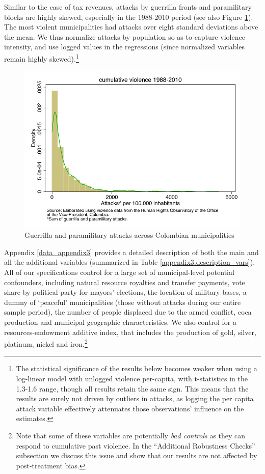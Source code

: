 Similar to the case of tax revenues, attacks by guerrilla fronts and paramilitary blocks are highly skewed, especially in the 1988-2010 period (see also Figure \ref{chapter3_fig:map}). The most violent municipalities had attacks over eight standard deviations above the mean. We thus normalize attacks by population so as to capture violence intensity, and use logged values in the regressions (since normalized variables remain highly skewed).\footnote{The statistical significance of the results below becomes weaker when using a log-linear model with unlogged violence per-capita, with t-statistics in the 1.3-1.6 range, though all results retain the same sign. This means that the results are surely not driven by outliers in attacks, as logging the per capita attack variable effectively attenuates those observations' influence on the estimates.}

\begin{figure}[H]
\begin{center}
\caption{Guerrilla and paramilitary attacks across Colombian municipalities}
\label{chapter3_fig:map}
\includegraphics[width=1\textwidth]{Chapter3/Figures/figure4.pdf}
\end{center}
\end{figure}

Appendix \ref{data_appendix3} provides a detailed description of both the main and all the additional variables (summarized in Table \ref{appendix3:description_vars}). All of our specifications control for a large set of municipal-level potential confounders, including natural resource royalties and transfer payments, vote share by political party for mayors' elections, the location of military bases, a dummy of `peaceful' municipalities (those without attacks during our entire sample period), the number of people displaced due to the armed conflict, coca production and municipal geographic characteristics. We also control for a resources-endowment additive index, that includes the production of gold, silver, platinum, nickel and iron.\footnote{Note that some of these variables are potentially {\it bad controls} as they can respond to cumulative past violence. In the ``Additional Robustness Checks'' subsection we discuss this issue and show that our results are not affected by post-treatment bias.} 


